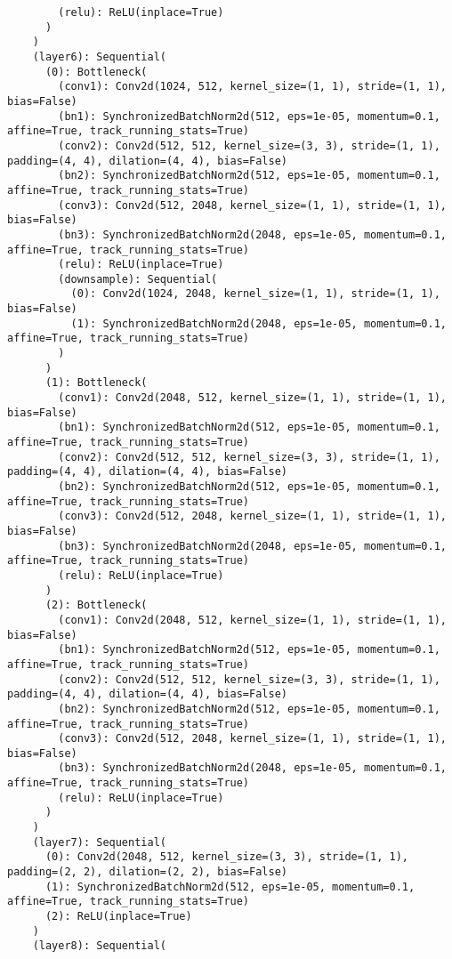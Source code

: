 \begin{verbatim}
        (relu): ReLU(inplace=True)
      )
    )
    (layer6): Sequential(
      (0): Bottleneck(
        (conv1): Conv2d(1024, 512, kernel_size=(1, 1), stride=(1, 1), bias=False)
        (bn1): SynchronizedBatchNorm2d(512, eps=1e-05, momentum=0.1, affine=True, track_running_stats=True)
        (conv2): Conv2d(512, 512, kernel_size=(3, 3), stride=(1, 1), padding=(4, 4), dilation=(4, 4), bias=False)
        (bn2): SynchronizedBatchNorm2d(512, eps=1e-05, momentum=0.1, affine=True, track_running_stats=True)
        (conv3): Conv2d(512, 2048, kernel_size=(1, 1), stride=(1, 1), bias=False)
        (bn3): SynchronizedBatchNorm2d(2048, eps=1e-05, momentum=0.1, affine=True, track_running_stats=True)
        (relu): ReLU(inplace=True)
        (downsample): Sequential(
          (0): Conv2d(1024, 2048, kernel_size=(1, 1), stride=(1, 1), bias=False)
          (1): SynchronizedBatchNorm2d(2048, eps=1e-05, momentum=0.1, affine=True, track_running_stats=True)
        )
      )
      (1): Bottleneck(
        (conv1): Conv2d(2048, 512, kernel_size=(1, 1), stride=(1, 1), bias=False)
        (bn1): SynchronizedBatchNorm2d(512, eps=1e-05, momentum=0.1, affine=True, track_running_stats=True)
        (conv2): Conv2d(512, 512, kernel_size=(3, 3), stride=(1, 1), padding=(4, 4), dilation=(4, 4), bias=False)
        (bn2): SynchronizedBatchNorm2d(512, eps=1e-05, momentum=0.1, affine=True, track_running_stats=True)
        (conv3): Conv2d(512, 2048, kernel_size=(1, 1), stride=(1, 1), bias=False)
        (bn3): SynchronizedBatchNorm2d(2048, eps=1e-05, momentum=0.1, affine=True, track_running_stats=True)
        (relu): ReLU(inplace=True)
      )
      (2): Bottleneck(
        (conv1): Conv2d(2048, 512, kernel_size=(1, 1), stride=(1, 1), bias=False)
        (bn1): SynchronizedBatchNorm2d(512, eps=1e-05, momentum=0.1, affine=True, track_running_stats=True)
        (conv2): Conv2d(512, 512, kernel_size=(3, 3), stride=(1, 1), padding=(4, 4), dilation=(4, 4), bias=False)
        (bn2): SynchronizedBatchNorm2d(512, eps=1e-05, momentum=0.1, affine=True, track_running_stats=True)
        (conv3): Conv2d(512, 2048, kernel_size=(1, 1), stride=(1, 1), bias=False)
        (bn3): SynchronizedBatchNorm2d(2048, eps=1e-05, momentum=0.1, affine=True, track_running_stats=True)
        (relu): ReLU(inplace=True)
      )
    )
    (layer7): Sequential(
      (0): Conv2d(2048, 512, kernel_size=(3, 3), stride=(1, 1), padding=(2, 2), dilation=(2, 2), bias=False)
      (1): SynchronizedBatchNorm2d(512, eps=1e-05, momentum=0.1, affine=True, track_running_stats=True)
      (2): ReLU(inplace=True)
    )
    (layer8): Sequential(

\end{verbatim}
